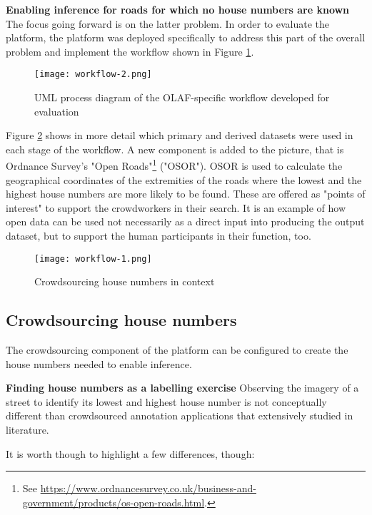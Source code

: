 \textbf{Enabling inference for roads for which no house numbers are known} The focus going forward is on the latter problem. In order to evaluate the platform, the platform was deployed specifically to address this part of the overall problem and implement the workflow shown in Figure \ref{fig:workflow_2}.

\begin{figure}
	\texttt{[image: workflow-2.png]}
	\caption{UML process diagram of the OLAF-specific workflow developed for evaluation}
	\label{fig:workflow_2}
\end{figure}

Figure \ref{fig:workflow_1} shows in more detail which primary and derived datasets were used in each stage of the workflow. A new component is added to the picture, that is Ordnance Survey's "Open Roads"\footnote{See \url{https://www.ordnancesurvey.co.uk/business-and-government/products/os-open-roads.html}.} ("OSOR"). OSOR is used to calculate the geographical coordinates of the extremities of the roads where the lowest and the highest house numbers are more likely to be found. These are offered as "points of interest" to support the crowdworkers in their search. It is an example of how open data can be used not necessarily as a direct input into producing the output dataset, but to support the human participants in their function, too.

\begin{figure}
	\texttt{[image: workflow-1.png]}
	\caption{Crowdsourcing house numbers in context}
	\label{fig:workflow_1}
\end{figure}

\subsection{Crowdsourcing house numbers}

The crowdsourcing component of the platform can be configured to create the house numbers needed to enable inference. 

\textbf{Finding house numbers as a labelling exercise} Observing the imagery of a street to identify its lowest and highest house number is not conceptually different than crowdsourced annotation applications that extensively studied in literature. 

It is worth though to highlight a few differences, though:


